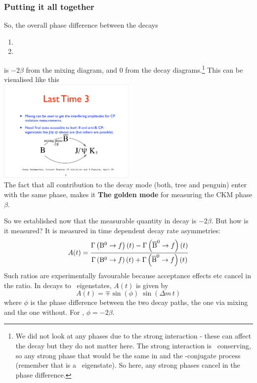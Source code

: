 \subsubsection{Putting it all together}
 So, the overall phase difference between the decays
\begin{enumerate}
 \item {}
 \item {}
\end{enumerate}
 is $-2\beta$ from the mixing diagram, and $0$ from the decay
 diagrams.\footnote{We did not look at any phases due to the strong interaction - these can affect the decay but they do not matter here. The strong interaction is \cp\ conserving, so any strong phase that would be the same in  and the \cp-conjugate process  (remember that  is a \cp\ eigenstate). So here, any strong phases cancel in the phase difference.}
 This can be visualised like this
\\
\includegraphics[width=0.5\textwidth]{fig/C_P_CP/B2JpsiKs_beta}
\\
 The fact that all contribution to the decay mode (both,
 tree and penguin) enter with the same phase, makes it \textbf{The
 golden mode} for measuring the CKM phase $\beta$.

 So we established now that the measurable quantity in  decay is $-2\beta$. But how is it measured? It is measured in time dependent decay rate asymmetries:
\begin{equation}
\label{eq:timedepasy}
A\!\left(t\right) =
\frac{   \Gamma\left({\rm B^0} \to f \right)(t)
        -\Gamma\left({\rm \overline{B}^0} \to f \right)(t)
    }{
         \Gamma\left({\rm B^0} \to f \right)(t)
        +\Gamma\left({\rm \overline{B}^0} \to f \right)(t)
    }
\end{equation}
 Such ratios are experimentally favourable because acceptance effects
 etc cancel in the ratio.
 In decays to \cp\ eigenstates, $A(t)$ is given by
\begin{equation}
 A(t) = \mp \sin(\phi) \; \sin(\Delta\!m\, t)
\end{equation}
 where $\phi$ is the phase difference between the two decay paths, the one via mixing and the one without. For , $\phi = -2\beta$.
 

